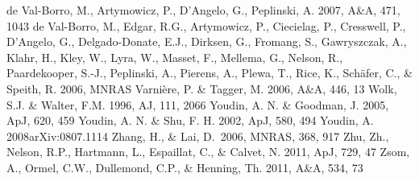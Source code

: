 \documentclass[apj]{emulateapj}
\begin{document}
\begin{thebibliography}{}
de Val-Borro, M., Artymowicz, P., D'Angelo, G., Peplinski, A. 2007, A\&A, 471, 1043
de Val-Borro, M., Edgar, R.G., Artymowicz, P., Ciecielag, P., Cresswell, P., D'Angelo, G., Delgado-Donate, E.J., Dirksen, G., Fromang, S., Gawryszczak, A., Klahr, H., Kley, W., Lyra, W., Masset, F., Mellema, G., Nelson, R., Paardekooper, S.-J., Peplinski, A., Pierens, A., Plewa, T., Rice, K., Sch\"afer, C., \& Speith, R. 2006, MNRAS
 Varni\`ere, P. \& Tagger, M. 2006, A\&A, 446, 13
 Wolk, S.J. \& Walter, F.M. 1996, AJ, 111, 2066
 Youdin, A. N. \& Goodman, J. 2005, ApJ, 620, 459
 Youdin, A. N. \& Shu, F. H. 2002, ApJ, 580, 494
 Youdin, A. 2008arXiv:0807.1114
 Zhang, H., \& Lai, D.\ 2006, MNRAS, 368, 917
 Zhu, Zh., Nelson, R.P., Hartmann, L.,  Espaillat, C., \& Calvet, N. 2011, ApJ, 729, 47
 Zsom, A., Ormel, C.W., Dullemond, C.P., \& Henning, Th. 2011, A\&A, 534, 73
\end{thebibliography}
\end{document}

